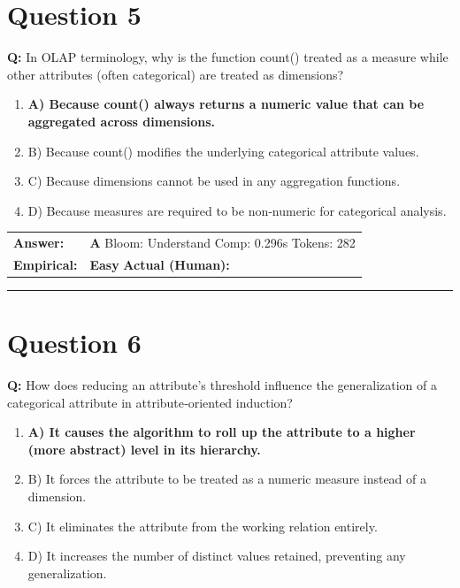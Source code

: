 \documentclass[9pt]{article}
\begin{document}
\section*{Question 5}

\textbf{Q:} In OLAP terminology, why is the function count() treated as a measure while other attributes (often categorical) are treated as dimensions?

\begin{enumerate}[label=\textbf{\alph{*})}, nosep]
    \item \textbf{A) Because count() always returns a numeric value that can be aggregated across dimensions.} %
    \item B) Because count() modifies the underlying categorical attribute values.
    \item C) Because dimensions cannot be used in any aggregation functions.
    \item D) Because measures are required to be non‑numeric for categorical analysis.

\end{enumerate}

\begin{tabular}{@{}l p{10.5cm}@{}}
\textbf{Answer:} & \textbf{A} \hspace{1em} Bloom: Understand \hspace{1em} Comp: 0.296s \hspace{1em} Tokens: 282 \\
\textbf{Empirical:} & \textbf{Easy} \hspace{1em} \textbf{Actual (Human):} \underline{\hspace{5cm}}
\end{tabular}

\vspace{0.2cm}
\rule{\textwidth}{0.4pt}
\vspace{0.2cm}


\section*{Question 6}

\textbf{Q:} How does reducing an attribute’s threshold influence the generalization of a categorical attribute in attribute‑oriented induction?

\begin{enumerate}[label=\textbf{\alph{*})}, nosep]
    \item \textbf{A) It causes the algorithm to roll up the attribute to a higher (more abstract) level in its hierarchy.} %
    \item B) It forces the attribute to be treated as a numeric measure instead of a dimension.
    \item C) It eliminates the attribute from the working relation entirely.
    \item D) It increases the number of distinct values retained, preventing any generalization.

\end{enumerate}
\end{document}
